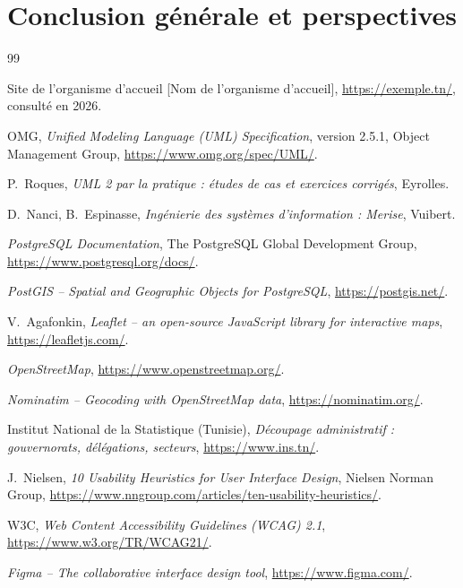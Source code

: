 \documentclass[a4paper, 12pt]{report}
\newcommand{\rapportEntreprise}{[Nom de l'organisme d'accueil]} %
\begin{document}
\chapter{Conclusion générale et perspectives}
\label{chap:conclusion}


\begin{thebibliography}{99}
\setlength{\itemsep}{10pt}

 Site de l'organisme d'accueil \rapportEntreprise, \url{https://exemple.tn/}, consulté en 2026. %

 OMG, \emph{Unified Modeling Language (UML) Specification}, version 2.5.1, Object Management Group, \url{https://www.omg.org/spec/UML/}.

 P.~Roques, \emph{UML 2 par la pratique : études de cas et exercices corrigés}, Eyrolles.

 D.~Nanci, B.~Espinasse, \emph{Ingénierie des systèmes d'information : Merise}, Vuibert.

 \emph{PostgreSQL Documentation}, The PostgreSQL Global Development Group, \url{https://www.postgresql.org/docs/}.

 \emph{PostGIS -- Spatial and Geographic Objects for PostgreSQL}, \url{https://postgis.net/}.

 V.~Agafonkin, \emph{Leaflet -- an open-source JavaScript library for interactive maps}, \url{https://leafletjs.com/}.

 \emph{OpenStreetMap}, \url{https://www.openstreetmap.org/}.

 \emph{Nominatim -- Geocoding with OpenStreetMap data}, \url{https://nominatim.org/}.

 Institut National de la Statistique (Tunisie), \emph{Découpage administratif : gouvernorats, délégations, secteurs}, \url{https://www.ins.tn/}.

 J.~Nielsen, \emph{10 Usability Heuristics for User Interface Design}, Nielsen Norman Group, \url{https://www.nngroup.com/articles/ten-usability-heuristics/}.

 W3C, \emph{Web Content Accessibility Guidelines (WCAG) 2.1}, \url{https://www.w3.org/TR/WCAG21/}.

 \emph{Figma -- The collaborative interface design tool}, \url{https://www.figma.com/}.

\end{thebibliography}
\end{document}
